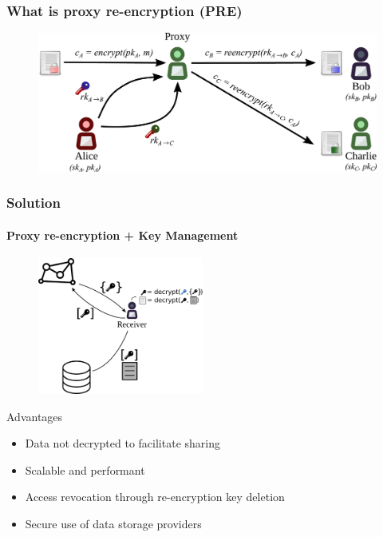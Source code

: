 \documentclass[xetex,mathsans,sans,aspectratio=169]{beamer}
\begin{document}
    \begin{frame}
        \frametitle{What is proxy re-encryption (PRE)}
        \begin{figure}
            \centering
            \includegraphics[width=13cm]{pdf/pre-multi.pdf}
        \end{figure}
    \end{frame}

    \begin{frame}
        \frametitle{Solution}
        \framesubtitle{Proxy re-encryption + Key Management}
        \begin{figure}
            \centering
            \includegraphics[height=4.5cm]{pdf/pre-kms.pdf}
        \end{figure}

        Advantages
        \begin{itemize}
            \item Data not decrypted to facilitate sharing
            \item Scalable and performant
            \item Access revocation through re-encryption key deletion
            \item Secure use of data storage providers
        \end{itemize}
    \end{frame}
\end{document}
